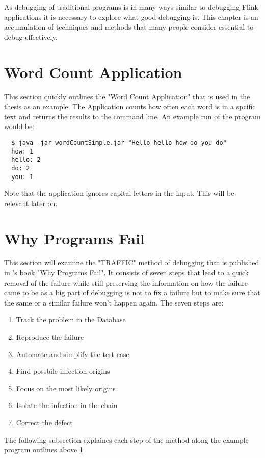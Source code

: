 As debugging of traditional programs is in many ways similar to debugging Flink applications it is necessary to explore what good debugging is. This chapter is an accumulation of techniques and methods that many people consider essential to debug effectively.

\section{Word Count Application}
\label{wordCountApplication}
This section quickly outlines the "Word Count Application" that is used in the thesis as an example. The Application counts how often each word is in a spcific text and returns the results to the command line. An example run of the program would be:

\begin{lstlisting}
  $ java -jar wordCountSimple.jar "Hello hello how do you do"
  how: 1
  hello: 2
  do: 2
  you: 1
\end{lstlisting}

Note that the application ignores capital letters in the input. This will be relevant later on.

\section{Why Programs Fail}
This section will examine the "TRAFFIC" method of debugging that is published in \cite{Zeller:2009:WPF:1718010}'s book "Why Programs Fail". It consists of seven steps that lead to a quick removal of the failure while still preserving the information on how the failure came to be as a big part of debugging is not to fix a failure but to make sure that the same or a similar failure won't happen again.
The seven steps are:
\begin{enumerate}
  \item Track the problem in the Database
  \item Reproduce the failure
  \item Automate and simplify the test case
  \item Find possbile infection origins
  \item Focus on the most likely origins
  \item Isolate the infection in the chain
  \item Correct the defect
\end{enumerate}

The following subsection explaines each step of the method along the example program outlines above \ref{wordCountApplication}


